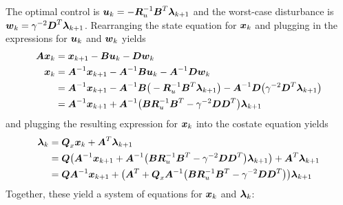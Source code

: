 The optimal control is $\vb*{u}_{k} = -\vb*{R}_{u}^{-1} \vb*{B}^{T} \vb*{\lambda}_{k+1}$ and the worst-case disturbance is $\vb*{w}_{k} = \gamma^{-2} \vb*{D}^{T} \vb*{\lambda}_{k+1}$.  Rearranging the state equation for $\vb*{x}_{k}$ and plugging in the expressions for $\vb*{u}_{k}$ and $\vb*{w}_{k}$ yields
\begin{equation}
\begin{aligned}
	\vb*{A}\vb*{x}_{k} &= \vb*{x}_{k+1} - \vb*{B}\vb*{u}_{k} - \vb*{D}\vb*{w}_{k}\\
	\vb*{x}_{k} &= \vb*{A}^{-1}\vb*{x}_{k+1} - \vb*{A}^{-1}\vb*{B}\vb*{u}_{k}
		- \vb*{A}^{-1}\vb*{D}\vb*{w}_{k}\\
	&= \vb*{A}^{-1}\vb*{x}_{k+1} - \vb*{A}^{-1} \vb*{B} \big{(}-\vb*{R}_{u}^{-1}
		\vb*{B}^{T} \vb*{\lambda}_{k+1} \big{)} - \vb*{A}^{-1}\vb*{D} \big{(}
			\gamma^{-2} \vb*{D}^{T} \vb*{\lambda}_{k+1} \big{)}\\
	&= \vb*{A}^{-1}\vb*{x}_{k+1} + \vb*{A}^{-1} \big{(} \vb*{B} \vb*{R}_{u}^{-1} \vb*{B}^{T}
		- \gamma^{-2} \vb*{D}\vb*{D}^{T} \big{)} \vb*{\lambda}_{k+1}
\end{aligned}
\end{equation}
and plugging the resulting expression for $\vb*{x}_{k}$ into the costate equation yields
\begin{equation}
\begin{aligned}
	\vb*{\lambda}_{k} &= \vb*{Q}_{x}\vb*{x}_{k} + \vb*{A}^{T}\vb*{\lambda}_{k+1}\\
	&= \vb*{Q} \big{(} \vb*{A}^{-1}\vb*{x}_{k+1} + \vb*{A}^{-1} \big{(}
			\vb*{B} \vb*{R}_{u}^{-1} \vb*{B}^{T} - \gamma^{-2} \vb*{D}\vb*{D}^{T}
			\big{)} \vb*{\lambda}_{k+1} \big{)} + \vb*{A}^{T}\vb*{\lambda}_{k+1}\\
	&= \vb*{Q} \vb*{A}^{-1}\vb*{x}_{k+1} + \big{(} \vb*{A}^{T} +\vb*{Q}_{x}\vb*{A}^{-1}
			\big{(} \vb*{B} \vb*{R}_{u}^{-1} \vb*{B}^{T} - \gamma^{-2} \vb*{D}\vb*{D}^{T} \big{)}
			\big{)} \vb*{\lambda}_{k+1}\\
\end{aligned}
\end{equation}
Together, these yield a system of equations for $\vb*{x}_{k}$ and $\vb*{\lambda}_{k}$:
